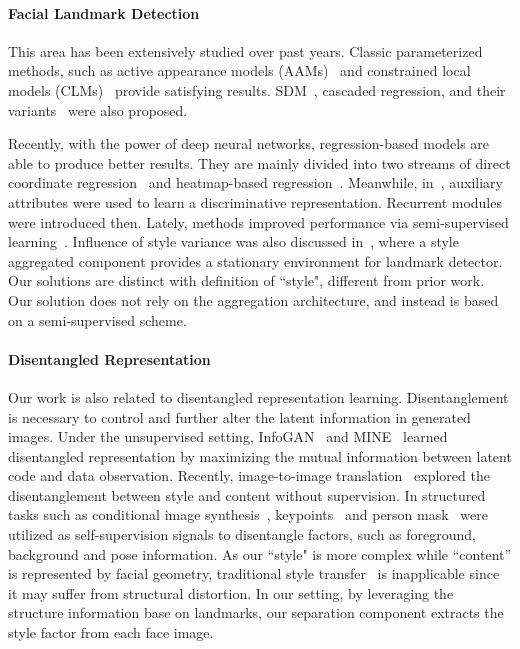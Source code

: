 \documentclass[10pt,twocolumn,letterpaper]{article}
\begin{document}
\vspace{-0.1in}
\paragraph{Facial Landmark Detection} This area has been extensively studied over past years. Classic parameterized methods, such as active appearance models (AAMs)~\cite{AAM,nonlinearAAM,AAMR,kahraman2007active} and constrained local models (CLMs)~\cite{CLM} provide satisfying results. SDM~\cite{SDM}, cascaded regression, and their variants~\cite{cpm_true, zhu2016unconstrained, CFSS, ESR, burgos2013robust, chen2014joint,SDM,tuzel2016robust,feng2015cascaded} were also proposed. 

Recently, with the power of deep neural networks, regression-based models are able to produce better results. They are mainly divided into two streams of direct coordinate regression~\cite{TCDCN,TSR,MDM,miao2018direct} and heatmap-based regression~\cite{hourglass,CALE,deng2017joint,menpo2017,merget2018robust}. Meanwhile, in~\cite{TCDCN}, auxiliary attributes were used to learn a discriminative representation. Recurrent modules~\cite{MDM,rar,pengrecurrent} were introduced then. Lately, methods improved performance via semi-supervised learning~\cite{semi}. Influence of style variance was also discussed in~\cite{SAN}, where a style aggregated component provides a stationary environment for landmark detector. Our solutions are distinct with definition of ``style", different from prior work. Our solution does not rely on the aggregation architecture, and instead is based on a semi-supervised scheme.

\vspace{-0.1in}
\paragraph{Disentangled Representation} Our work is also related to disentangled representation learning. Disentanglement is necessary to control and further alter the latent information in generated images. Under the unsupervised setting, InfoGAN~\cite{chen2016infogan} and MINE~\cite{MINE} learned disentangled representation by maximizing the mutual information between latent code and data observation. Recently, image-to-image translation~\cite{UNIT,MUNIT,DRIT,cGAN} explored the disentanglement between style and content without supervision. 
In structured tasks such as conditional image synthesis~\cite{poseguided}, keypoints~\cite{vunet,pumarola2018unsupervised} and person mask~\cite{balakrishnan2018synthesizing} were utilized as self-supervision signals to disentangle factors, such as foreground, background and pose information. As our ``style" is more complex while ``content'' is represented by facial geometry, traditional style transfer~\cite{gatys2016image} is inapplicable since it may suffer from structural distortion. In our setting, by leveraging the structure information base on landmarks, our separation component extracts the style factor from each face image. 
\end{document}
